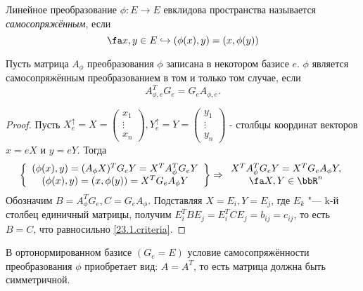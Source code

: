 \begin{defn}
  Линейное преобразование $\phi: E \rightarrow E$ евклидова пространства называется \textit{самосопряжённым}, если
  \begin{equation}\label{23.1.selfadjoint}
  \fa x,y \in E \hookrightarrow (\phi(x),y)=(x,\phi(y))
  \end{equation}
\end{defn}
  \begin{thm} Пусть матрица $A_\phi$ преобразования $\phi$ записана в некотором базисе $e$. $\phi$ является самосопряжённым преобразованием в том и только том случае, если
  \begin{equation}\label{23.1.criteria}
  A^T_{\phi,e}G_e=G_eA_{\phi,e}.
  \end{equation}  
  \end{thm}    
  \begin{proof}
  Пусть $X_e^\uparrow=X=
  \begin{pmatrix}
  x_1 \\ \vdots \\ x_n
  \end{pmatrix},Y_e^\uparrow=Y=
  \begin{pmatrix}
  y_1 \\ \vdots \\ y_n
  \end{pmatrix}$ - столбцы координат векторов $x=eX$ и $y=eY$. Тогда
  \begin{equation*}
  \left\lbrace \begin{array}{crl}
    (\phi(x),y)=(A_\phi X)^TG_eY=X^TA_\phi^TG_eY \\
    (\phi(x),y)=(x,\phi(y))=X^TG_eA_\phi Y \\
    \end{array}\right\rbrace \Rightarrow  \begin{array}{crl}
    X^TA_\phi^TG_eY=X^TG_eA_\phi Y, \\ \fa X,Y\in \bbR^n
  \end{array}     
  \end{equation*}   
  Обозначим $B=A_\phi^TG_e, C=G_eA_\phi$. Подставляя $X=E_i, Y=E_j$, где $E_k$ "--- k-й столбец единичный матрицы, получим $E_i^TBE_j=E_i^TCE_j=b_{ij}=c_{ij}$, то есть $B=C$, что равносильно \eqref{23.1.criteria}.
  \end{proof}
  \begin{cons}
  В ортонормированном базисе $(G_e=E)$ условие самосопряжённости преобразования $\phi$ приобретает вид: $A=A^T$, то есть матрица должна быть симметричной.
  \end{cons}


